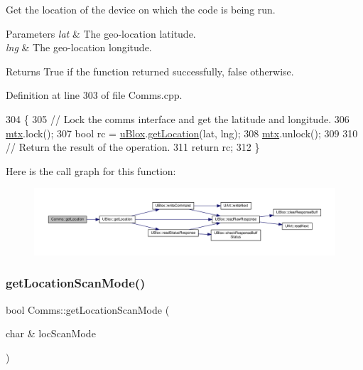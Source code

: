 Get the location of the device on which the code is being run.


\begin{DoxyParams}{Parameters}
{\em lat} & The geo-\/location latitude. \\
\hline
{\em lng} & The geo-\/location longitude. \\
\hline
\end{DoxyParams}
\begin{DoxyReturn}{Returns}
True if the function returned successfully, false otherwise. 
\end{DoxyReturn}


Definition at line 303 of file Comms.\+cpp.


\begin{DoxyCode}
304 \{
305     \textcolor{comment}{// Lock the comms interface and get the latitude and longitude.}
306     \hyperlink{class_comms_a21df861b1202573e4cd0cb5666d638fe}{mtx}.lock();
307     \textcolor{keywordtype}{bool} rc = \hyperlink{class_comms_ac64dea134b116147e5441172346dbd6c}{uBlox}.\hyperlink{class_u_blox_a2443d175bbf55a4f4facc5d8a99d2723}{getLocation}(lat, lng);
308     \hyperlink{class_comms_a21df861b1202573e4cd0cb5666d638fe}{mtx}.unlock();
309 
310     \textcolor{comment}{// Return the result of the operation.}
311     \textcolor{keywordflow}{return} rc;
312 \}
\end{DoxyCode}
Here is the call graph for this function\+:\nopagebreak
\begin{figure}[H]
\begin{center}
\leavevmode
\includegraphics[width=350pt]{d8/dcc/class_comms_a083b399b3115711b1e2d55f800cac58c_cgraph}
\end{center}
\end{figure}
\mbox{\label{class_comms_a8f9893e235e62f8fc752f05a06383e68}} 
\subsubsection{\texorpdfstring{get\+Location\+Scan\+Mode()}{getLocationScanMode()}}
{\footnotesize\ttfamily bool Comms\+::get\+Location\+Scan\+Mode (\begin{DoxyParamCaption}\item[{char \&}]{loc\+Scan\+Mode }\end{DoxyParamCaption})}


